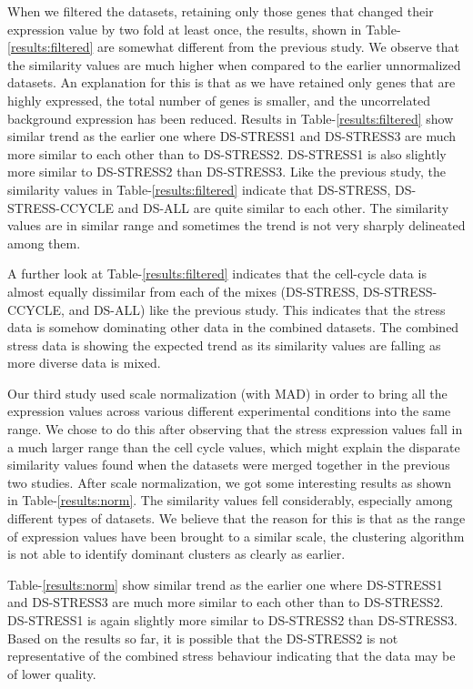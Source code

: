 When we filtered the datasets, retaining only those genes that changed their expression value by two fold at least once, the results, shown in Table-\ref{results:filtered} are somewhat different from the previous study. We observe that the similarity values are much higher when compared to the earlier unnormalized datasets. An explanation for this is that as we have retained only genes that are highly expressed, the total number of genes is smaller, and the uncorrelated background expression has been reduced. Results in Table-\ref{results:filtered} show similar trend as the earlier one where DS-STRESS1 and DS-STRESS3 are much more similar to each other than to DS-STRESS2. DS-STRESS1 is also slightly more similar to DS-STRESS2 than DS-STRESS3. Like the previous study, the similarity values in Table-\ref{results:filtered} indicate that DS-STRESS, DS-STRESS-CCYCLE and DS-ALL are quite similar to each other. The similarity values are in similar range and sometimes the trend is not very sharply delineated among them. 

A further look at Table-\ref{results:filtered} indicates that the cell-cycle data is almost equally dissimilar from each of the mixes (DS-STRESS, DS-STRESS-CCYCLE, and DS-ALL) like the previous study. This indicates that the stress data is somehow dominating other data in the combined datasets. The combined stress data is showing the expected trend as its similarity values are falling as more diverse data is mixed.

Our third study used scale normalization (with MAD) in order to bring all the expression values across various different experimental conditions into the same range. We chose to do this after observing that the stress expression values fall in a much larger range than the cell cycle values, which might explain the disparate similarity values found when the datasets were merged together in the previous two studies. After scale normalization, we got some interesting results as shown in Table-\ref{results:norm}. The similarity values fell considerably, especially among different types of datasets. We believe that the reason for this is that as the range of expression values have been brought to a similar scale, the clustering algorithm is not able to identify dominant clusters as clearly as earlier. 

Table-\ref{results:norm} show similar trend as the earlier one where DS-STRESS1 and DS-STRESS3 are much more similar to each other than to DS-STRESS2. DS-STRESS1 is again slightly more similar to DS-STRESS2 than DS-STRESS3. Based on the results so far, it is possible that the DS-STRESS2 is not representative of the combined stress behaviour indicating that the data may be of lower quality. 

